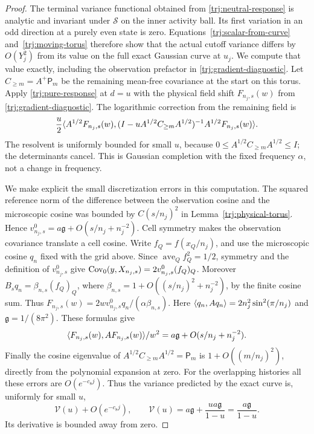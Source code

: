 \begin{proof}
The terminal variance functional obtained from
\eqref{trj:neutral-response} is analytic and invariant under
\(\mathcal S\) on the inner activity ball.  Its first variation in an odd direction at a
purely even state is zero.  Equations~\eqref{trj:scalar-from-curve}
and~\eqref{trj:moving-torus} therefore show that the actual cutoff
variance differs by \(O(Y_j^2)\) from its value on the full exact
Gaussian curve at \(u_j\).  We compute that value exactly, including
the observation prefactor in \eqref{trj:gradient-diagnostic}.
Let \(C_{\ge m}=A^+\mathsf P_m\) be the remaining mean-free covariance at the
start on this torus.  Apply \eqref{trj:pure-response} at \(d=u\) with
the physical field shift \(F_{n_j,s}(w)\) from
\eqref{trj:gradient-diagnostic}.  The logarithmic correction from the
remaining field is
\begin{equation}\label{trj:exact-gaussian-response}
 \frac{u}{2}\langle A^{1/2}F_{n_j,s}(w),
 (I-uA^{1/2}C_{\ge m}A^{1/2})^{-1}A^{1/2}F_{n_j,s}(w)\rangle.
\end{equation}
The resolvent is uniformly bounded for small \(u\), because
\(0\le A^{1/2}C_{\ge m}A^{1/2}\le I\); the determinants cancel.
This is Gaussian completion with the fixed frequency \(\alpha\),
not a change in frequency.

We make explicit the small discretization errors in this computation.
The squared reference norm of the difference between the observation
cosine and the microscopic cosine was bounded by \(C(s/n_j)^2\) in
Lemma~\ref{trj:physical-torus}.  Hence
\(v^0_{n_j,s}=a\mathfrak g+O(s/n_j+n_j^{-2})\).
Cell symmetry makes the observation covariance translate a cell cosine.
Write \(f_Q=f(x_Q/n_j)\), and use the microscopic cosine \(q_n\)
fixed with the grid above.  Since \(\operatorname{ave}_Q f_Q^2=1/2\), symmetry
and the definition of \(v^0_{n_j,s}\) give
\(\operatorname{Cov}_0(y,X_{n_j,s})=2v^0_{n_j,s}(f_Q)_Q\).
Moreover \(B_sq_n=\beta_{n,s}(f_Q)_Q\), where
\(\beta_{n,s}=1+O((s/n_j)^2+n_j^{-2})\), by the finite cosine sum.
Thus \(F_{n_j,s}(w)=2wv^0_{n_j,s}q_n/(\alpha\beta_{n,s})\).
Here \(\langle q_n,Aq_n\rangle=2n_j^2\sin^2(\pi/n_j)\) and
\(\mathfrak g=1/(8\pi^2)\).  These formulas give
\[
 \langle F_{n_j,s}(w),AF_{n_j,s}(w)\rangle/w^2
             =a\mathfrak g+O(s/n_j+n_j^{-2}).
\]
Finally the cosine eigenvalue of
\(A^{1/2}C_{\ge m}A^{1/2}=\mathsf P_m\) is
\(1+O((m/n_j)^2)\), directly from the polynomial expansion at zero.
For the overlapping histories all these errors are \(O(e^{-c_8j})\).
Thus the variance predicted by the exact curve is, uniformly for small
\(u\),
\begin{equation}\label{trj:common-variance}
 \mathcal V(u)+O(e^{-c_8j}),\qquad
 \mathcal V(u)=a\mathfrak g+\frac{u a\mathfrak g}{1-u}
                         =\frac{a\mathfrak g}{1-u}.
\end{equation}
Its derivative is bounded away from zero.


\end{proof}
